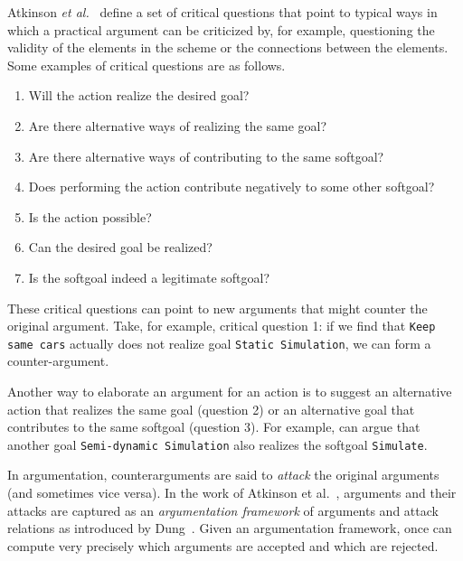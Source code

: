 Atkinson \emph{et al.}~\cite{atkinson2007} define a set of critical questions that point to typical ways in which a practical argument can be criticized by, for example, questioning the validity of the elements in the scheme or the connections between the elements. Some examples of critical questions are as follows.

\begin{enumerate}
\item Will the action realize the desired goal?
\item Are there alternative ways of realizing the same goal?
\item Are there alternative ways of contributing to the same softgoal?
\item Does performing the action contribute negatively to some other softgoal?
\item Is the action possible?
\item Can the desired goal be realized?
\item Is the softgoal indeed a legitimate softgoal?
\end{enumerate}

These critical questions can point to new arguments that might counter the original argument. Take, for example, critical question 1: if we find that  \texttt{Keep same cars} actually does not realize goal \texttt{Static Simulation}, we can form a counter-argument.

Another way to elaborate an argument for an action is to suggest an alternative action that realizes the same goal (question 2) or an alternative goal that contributes to the same softgoal (question 3). For example,  can argue that another goal \texttt{Semi-dynamic Simulation} also realizes the softgoal \texttt{Simulate}. 

In argumentation, counterarguments are said to \emph{attack} the original arguments (and sometimes vice versa). In the work of Atkinson et al.~\cite{atkinson2007}, arguments and their attacks are captured as an \emph{argumentation framework} of arguments and attack relations as introduced by Dung~\cite{Dung1995}. Given an argumentation framework, once can compute very precisely which arguments are accepted and which are rejected. 

